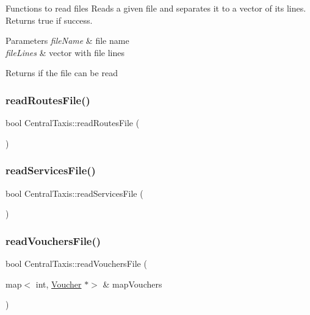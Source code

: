Functions to read files Reads a given file and separates it to a vector of its lines. Returns true if success. 
\begin{DoxyParams}{Parameters}
{\em file\+Name} & file name \\
\hline
{\em file\+Lines} & vector with file lines \\
\hline
\end{DoxyParams}
\begin{DoxyReturn}{Returns}
if the file can be read 
\end{DoxyReturn}
\hypertarget{classCentralTaxis_a19d4f7d194ff8745f788ec748c35c017}{}\label{classCentralTaxis_a19d4f7d194ff8745f788ec748c35c017} 
\subsubsection{\texorpdfstring{read\+Routes\+File()}{readRoutesFile()}}
{\footnotesize\ttfamily bool Central\+Taxis\+::read\+Routes\+File (\begin{DoxyParamCaption}{ }\end{DoxyParamCaption})}

\hypertarget{classCentralTaxis_a5e41ce28aea248f923e5a4be43897d93}{}\label{classCentralTaxis_a5e41ce28aea248f923e5a4be43897d93} 
\subsubsection{\texorpdfstring{read\+Services\+File()}{readServicesFile()}}
{\footnotesize\ttfamily bool Central\+Taxis\+::read\+Services\+File (\begin{DoxyParamCaption}{ }\end{DoxyParamCaption})}

\hypertarget{classCentralTaxis_abc9cdf5bffe9022c1a06579d029f9ffb}{}\label{classCentralTaxis_abc9cdf5bffe9022c1a06579d029f9ffb} 
\subsubsection{\texorpdfstring{read\+Vouchers\+File()}{readVouchersFile()}}
{\footnotesize\ttfamily bool Central\+Taxis\+::read\+Vouchers\+File (\begin{DoxyParamCaption}\item[{map$<$ int, \hyperlink{classVoucher}{Voucher} $\ast$$>$ \&}]{map\+Vouchers }\end{DoxyParamCaption})}

